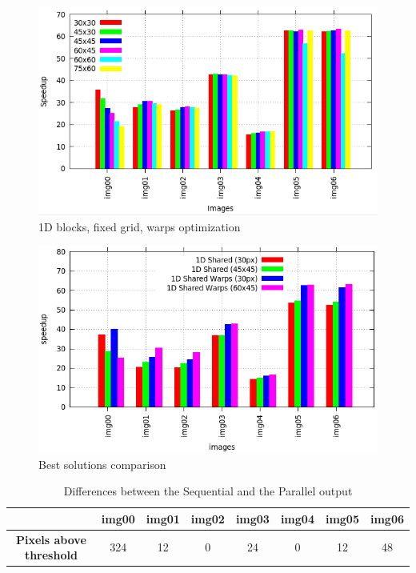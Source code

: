 \documentclass[a4paper]{article}
\begin{document}
\begin{figure}[!ht]
    \centering
    \includegraphics[width=0.7\linewidth]{res/new/histogram_warp_fixed}
    \caption{1D blocks, fixed grid, warps optimization}
    \label{fig:hwf}
\end{figure}
\FloatBarrier

\begin{figure}[!ht]
    \centering
    \includegraphics[width=0.7\linewidth]{res/new/histogram_more_confronto}
    \caption{Best solutions comparison}
    \label{fig:dbsc}
\end{figure}
\FloatBarrier



\begin{table}[!ht]
\centering
\caption{Differences between the Sequential and the Parallel output}
\label{pxabh}
\begin{tabular}{|c|l|c|c|l|l|l|l|}
\hline
\textbf{}                        & \textbf{img00}           & \textbf{img01} & \textbf{img02} & \textbf{img03}          & \textbf{img04}         & \textbf{img05}          & \textbf{img06}          \\ \hline
\textbf{Pixels above  threshold} & \multicolumn{1}{c|}{324} & 12             & 0              & \multicolumn{1}{c|}{24} & \multicolumn{1}{c|}{0} & \multicolumn{1}{c|}{12} & \multicolumn{1}{c|}{48} \\ \hline
\end{tabular}
\end{table}
 
\end{document}
